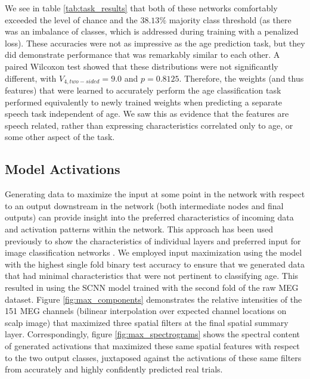 \documentclass[fleqn,10pt]{wlscirep}
\begin{document}
We see in table \ref{tab:task_results} that both of these networks comfortably exceeded the level of chance and the $38.13\%$ majority class threshold (as there was an imbalance of classes, which is addressed during training with a penalized loss). These accuracies were not as impressive as the age prediction task, but they did demonstrate performance that was remarkably similar to each other. A paired Wilcoxon test showed that these distributions were not significantly different, with $V_{4, two-sided}=9.0$ and $p=0.8125$. Therefore, the weights (and thus features) that were learned to accurately perform the age classification task performed equivalently to newly trained weights when predicting a separate speech task independent of age. We saw this as evidence that the features are speech related, rather than expressing characteristics correlated only to age, or some other aspect of the task.

\subsection*{Model Activations}

Generating data to maximize the input at some point in the network with respect to an output downstream in the network (both intermediate nodes and final outputs) can provide insight into the preferred characteristics of incoming data and activation patterns within the network. This approach has been used previously to show the characteristics of individual layers and preferred input for image classification networks \cite{Yosinski2015}. We employed input maximization using the model with the highest single fold binary test accuracy to ensure that we generated data that had minimal characteristics that were not pertinent to classifying age. This resulted in using the SCNN model trained with the second fold of the raw MEG dataset. Figure \ref{fig:max_components} demonstrates the relative intensities of the 151 MEG channels (bilinear interpolation over expected channel locations on scalp image) that maximized three spatial filters at the final spatial summary layer. Correspondingly, figure \ref{fig:max_spectrograms} shows the spectral content of generated activations that maximized these same spatial features with respect to the two output classes, juxtaposed against the activations of these same filters from accurately and highly confidently predicted real trials.
\end{document}
